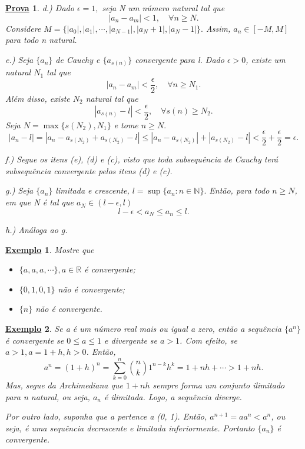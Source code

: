 \documentclass{article}
\newtheorem{example}{\underline{Exemplo}}
\newtheorem*{proof*}{\underline{Prova}}
\begin{document}
\begin{proof*}
d.) Dado $\epsilon = 1,$ seja N um n\'umero natural tal que 
  $$
    |a_{n}-a_{m}| < 1,\quad\forall n\geq{N}.
  $$
  Considere $M = \{|a_{0}|, |a_{1}|, \cdots, |a_{N-1}|, |a_{N}+1|, |a_{N}-1|\}.$ Assim, $a_{n}\in[-M, M]$ para todo n natural.

e.) Seja $\{a_{n}\}$ de Cauchy e $\{a_{s(n)}\}$ convergente para l. Dado $\epsilon > 0$, existe um natural $N_{1}$ tal que 
  $$
    |a_{n}-a_{m}| < \frac{\epsilon}{2},\quad\forall n\geq{N_{1}}.
  $$
  Al\'em disso, existe $N_{2}$ natural tal que 
  $$
    |a_{s(n)} - l| < \frac{\epsilon}{2},\quad\forall s(n)\geq{N_{2}}.
  $$
  Seja $N=\max\{s(N_{2}), N_{1}\}$ e tome $n\geq{N}.$
  $$
    |a_{n}-l| = |a_{n} - a_{s(N_{2})} + a_{s(N_{2})} - l| \leq{|a_{n}-a_{s(N_{2})}| + |a_{s(N_{2})} - l|} < \frac{\epsilon}{2} + \frac{\epsilon}{2} = \epsilon.
  $$

f.) Segue os itens (e), (d) e (c), visto que toda subsequ\^encia de Cauchy ter\'a subsequ\^encia convergente pelos itens (d) e (c).

g.) Seja $\{a_{n}\}$ limitada e crescente, $l = \sup\{a_{n}:n\in \mathbb{N}\}.$ Ent\~ao, para todo $n \geq{N}$, em que N \'e tal que $a_{N}\in(l-\epsilon, l)$
 $$
  l-\epsilon < a_{N}\leq{a_{n}} \leq{l}.
 $$

h.) An\'aloga ao g.
\end{proof*}
 \begin{example}
   Mostre que 
 \begin{itemize}
   \item[i)] $\{a, a, a, \cdots\},a\in \mathbb{R}$ \'e convergente;
   \item[ii)] $\{0, 1, 0, 1\}$ n\~ao \'e convergente;
   \item[iii)] $\{n\}$ n\~ao \'e convergente.
 \end{itemize}
 \end{example}
\begin{example}
  Se a \'e um n\'umero real mais ou igual a zero, ent\~ao a sequ\^encia $\{a^{n}\}$ \'e convergente se $0\leq{a}\leq{1}$ e divergente
  se $a > 1$. Com efeito, se $a > 1, a = 1 + h, h > 0$. Ent\~ao, 
  $$
    a^{n} = (1+h)^{n} = \sum\limits_{k=0}^{n}\binom{n}{k}1^{n-k}h^{k} = 1 + nh + \cdots > 1 + nh.
  $$
  Mas, segue da Archimediana que $1 + nh$ sempre forma um conjunto ilimitado para n natural, ou seja, $a_{n}$ \'e ilimitada. Logo, a sequ\^encia
diverge.

  Por outro lado, suponha que a pertence a (0, 1). Ent\~ao, $a^{n+1} = a a^{n} < a^{n}$, ou seja, \'e uma sequ\^encia decrescente e limitada inferiormente.
Portanto $\{a_{n}\}$ \'e convergente.
\end{example}
\end{document}
